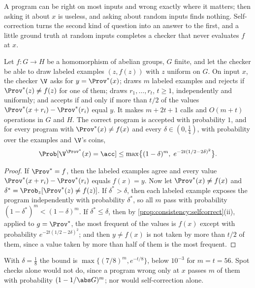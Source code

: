 \begin{refsection}
A program can be right on most inputs and wrong exactly where it matters; then asking it about $x$ is useless, and asking about random inputs finds nothing. Self-correction turns the second kind of question into an answer to the first, and a little ground truth at random inputs completes a checker that never evaluates $f$ at $x$.

\begin{theorem}\label{thm:consistency:spotcorrect}
Let $f\colon G\to H$ be a homomorphism of abelian groups, $G$ finite, and let the checker be able to draw labeled examples $(z,f(z))$ with $z$ uniform on $G$. On input $x$, the checker $\V$ asks for $y=\Prov^*(x)$; draws $m$ labeled examples and rejects if $\Prov^*(z)\ne f(z)$ for one of them; draws $r_1,\dots,r_t$, $t\ge1$, independently and uniformly; and accepts if and only if more than $t/2$ of the values $\Prov^*(x+r_i)-\Prov^*(r_i)$ equal $y$. It makes $m+2t+1$ calls and $O(m+t)$ operations in $G$ and $H$. The correct program is accepted with probability $1$, and for every program with $\Prov^*(x)\ne f(x)$ and every $\delta\in(0,\frac14)$, with probability over the examples and $\V$'s coins,
\[
  \Prob[\V^{\Prov^*}(x)=\acc]\le\max\bigl\{(1-\delta)^m,\;e^{-2t(1/2-2\delta)^2}\bigr\}.
\]
\end{theorem}

\begin{proof}
If $\Prov^*=f$, then the labeled examples agree and every value $\Prov^*(x+r_i)-\Prov^*(r_i)$ equals $f(x)=y$. Now let $\Prov^*(x)\ne f(x)$ and $\delta^*=\Prob_z[\Prov^*(z)\ne f(z)]$. If $\delta^*>\delta$, then each labeled example exposes the program independently with probability $\delta^*$, so all $m$ pass with probability $(1-\delta^*)^m<(1-\delta)^m$. If $\delta^*\le\delta$, then by \cref{prop:consistency:selfcorrect}(ii), applied to $g=\Prov^*$, the most frequent of the values is $f(x)$ except with probability $e^{-2t(1/2-2\delta)^2}$; and then $y\ne f(x)$ is not taken by more than $t/2$ of them, since a value taken by more than half of them is the most frequent.
\end{proof}

With $\delta=\frac18$ the bound is $\max\{(7/8)^m,e^{-t/8}\}$, below $10^{-3}$ for $m=t=56$. Spot checks alone would not do, since a program wrong only at $x$ passes $m$ of them with probability $(1-1/\abs G)^m$; nor would self-correction alone.



\end{refsection}
